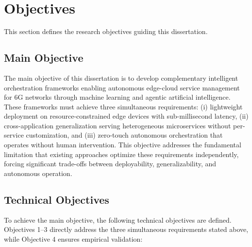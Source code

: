 \section{Objectives}
\label{sec:ch1_objectives}

This section defines the research objectives guiding this dissertation.

\subsection{Main Objective}
\label{subsec:ch1_main_objective}

The main objective of this dissertation is to develop complementary intelligent orchestration frameworks enabling autonomous edge-cloud service management for \ac{6G} networks through machine learning and agentic artificial intelligence. These frameworks must achieve three simultaneous requirements: (i) lightweight deployment on resource-constrained edge devices with sub-millisecond latency, (ii) cross-application generalization serving heterogeneous microservices without per-service customization, and (iii) zero-touch autonomous orchestration that operates without human intervention. This objective addresses the fundamental limitation that existing approaches optimize these requirements independently, forcing significant trade-offs between deployability, generalizability, and autonomous operation.

\subsection{Technical Objectives}
\label{subsec:ch1_technical_objectives}

To achieve the main objective, the following technical objectives are defined. Objectives 1--3 directly address the three simultaneous requirements stated above, while Objective 4 ensures empirical validation:

